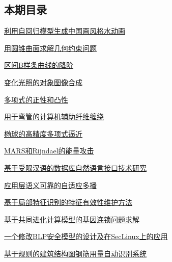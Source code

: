 \documentclass[a4paper]{article}
\begin{document}
\subsection{本期目录}
\href{http://www.jos.org.cn/ch/reader/download_pdf.aspx?file_no=20020401&year_id=2002&quarter_id=4&falg=1}{利用自回归模型生成中国画风格水动画}

\href{http://www.jos.org.cn/ch/reader/download_pdf.aspx?file_no=20020402&year_id=2002&quarter_id=4&falg=1}{用圆锥曲面求解几何约束问题}

\href{http://www.jos.org.cn/ch/reader/download_pdf.aspx?file_no=20020403&year_id=2002&quarter_id=4&falg=1}{区间B样条曲线的降阶}

\href{http://www.jos.org.cn/ch/reader/download_pdf.aspx?file_no=20020404&year_id=2002&quarter_id=4&falg=1}{变化光照的对象图像合成}

\href{http://www.jos.org.cn/ch/reader/download_pdf.aspx?file_no=20020405&year_id=2002&quarter_id=4&falg=1}{多项式的正性和凸性}

\href{http://www.jos.org.cn/ch/reader/download_pdf.aspx?file_no=20020406&year_id=2002&quarter_id=4&falg=1}{用于弯管的计算机辅助纤维缠绕}

\href{http://www.jos.org.cn/ch/reader/download_pdf.aspx?file_no=20020407&year_id=2002&quarter_id=4&falg=1}{椭球的高精度多项式逼近}

\href{http://www.jos.org.cn/ch/reader/download_pdf.aspx?file_no=20020408&year_id=2002&quarter_id=4&falg=1}{MARS和Rijndael的能量攻击}

\href{http://www.jos.org.cn/ch/reader/download_pdf.aspx?file_no=20020409&year_id=2002&quarter_id=4&falg=1}{基于受限汉语的数据库自然语言接口技术研究}

\href{http://www.jos.org.cn/ch/reader/download_pdf.aspx?file_no=20020410&year_id=2002&quarter_id=4&falg=1}{应用层语义可靠的自适应多播}

\href{http://www.jos.org.cn/ch/reader/download_pdf.aspx?file_no=20020411&year_id=2002&quarter_id=4&falg=1}{基于局部特征识别的特征有效性维护方法}

\href{http://www.jos.org.cn/ch/reader/download_pdf.aspx?file_no=20020412&year_id=2002&quarter_id=4&falg=1}{基于共同进化计算模型的基因连锁问题求解}

\href{http://www.jos.org.cn/ch/reader/download_pdf.aspx?file_no=20020413&year_id=2002&quarter_id=4&falg=1}{一个修改BLP安全模型的设计及在SecLinux上的应用}

\href{http://www.jos.org.cn/ch/reader/download_pdf.aspx?file_no=20020414&year_id=2002&quarter_id=4&falg=1}{基于规则的建筑结构图钢筋用量自动识别系统}
\end{document}
